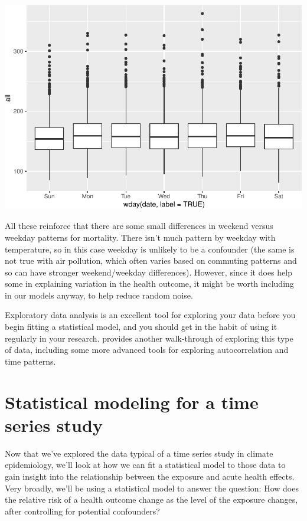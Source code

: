 \documentclass[
]{book}
\begin{document}
\includegraphics{adv_epi_analysis_files/figure-latex/unnamed-chunk-21-1.pdf}

All these reinforce that there are some small differences in weekend versus weekday
patterns for mortality. There isn't much pattern by weekday with temperature, so
in this case weekday is unlikely to be a confounder (the same is not true with
air pollution, which often varies based on commuting patterns and so can have
stronger weekend/weekday differences). However, since it does help some in explaining
variation in the health outcome, it might be worth including in our models anyway,
to help reduce random noise.

Exploratory data analysis is an excellent tool for exploring your data before
you begin fitting a statistical model, and you should get in the habit of using
it regularly in your research. \citet{dominici2008statistical5} provides another walk-through of exploring this type of data, including some more advanced tools
for exploring autocorrelation and time patterns.

\hypertarget{statistical-modeling-for-a-time-series-study}{%
\section{Statistical modeling for a time series study}\label{statistical-modeling-for-a-time-series-study}}

Now that we've explored the data typical of a time series study in climate
epidemiology, we'll look at how we can fit a statistical model to those
data to gain insight into the relationship between the exposure and
acute health effects. Very broadly, we'll be using a statistical model to answer
the question: How does the relative risk of a health outcome change as
the level of the exposure changes, after controlling for potential confounders?
\end{document}

